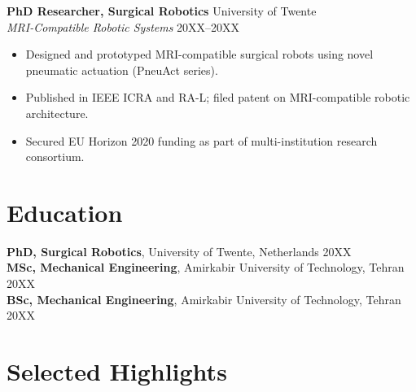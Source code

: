 \documentclass[10pt,a4paper]{article}
\begin{document}
\vspace{4pt}
\textbf{PhD Researcher, Surgical Robotics} \hfill University of Twente \\
{\small\textit{MRI-Compatible Robotic Systems}} \hfill {\small 20XX--20XX}
\begin{itemize}
 \item Designed and prototyped MRI-compatible surgical robots using novel pneumatic actuation (PneuAct series).
 \item Published in IEEE ICRA and RA-L; filed patent on MRI-compatible robotic architecture.
 \item Secured EU Horizon 2020 funding as part of multi-institution research consortium.
\end{itemize}

\section{Education}

\textbf{PhD, Surgical Robotics}, University of Twente, Netherlands \hfill 20XX \\
\textbf{MSc, Mechanical Engineering}, Amirkabir University of Technology, Tehran \hfill 20XX \\
\textbf{BSc, Mechanical Engineering}, Amirkabir University of Technology, Tehran \hfill 20XX

\section{Selected Highlights}
\end{document}
